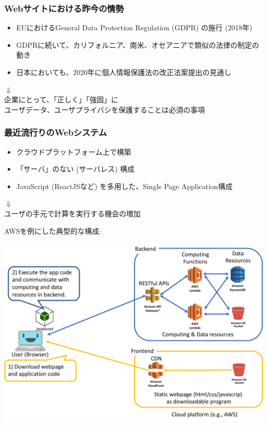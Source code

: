 \documentclass[12pt,dvipdfmx]{beamer}
\begin{document}
\begin{frame}
\frametitle{Webサイトにおける昨今の情勢}
\begin{itemize}
\item EUにおけるGeneral Data Protection Regulation (GDPR) の施行 (2018年)\\
\item GDPRに続いて、カリフォルニア、南米、オセアニアで類似の法律の制定の動き\\
\item 日本においても、2020年に個人情報保護法の改正法案提出の見通し
\end{itemize}
\begin{center}
$\Downarrow$\\
\alert{企業にとって、「正しく」「強固」に\\
ユーザデータ、ユーザプライバシを保護することは必須の事項}
\end{center}
\end{frame}

\begin{frame}
\frametitle{最近流行りのWebシステム}
\begin{itemize}
 \item クラウドプラットフォーム上で構築
 \item 「サーバ」のない (\alert{サーバレス}) 構成
 \item JavaScript (ReactJSなど) を多用した、Single Page Application構成
\end{itemize}
\begin{center}
$\Downarrow$\\
\alert{ユーザの手元で計算を実行する機会の増加}
\end{center}
\end{frame}

\begin{frame}
AWSを例にした典型的な構成:
\begin{center}
\includegraphics[width=0.85\linewidth]{Figs/spa1.pdf}
\end{center}
\end{frame}
\end{document}

